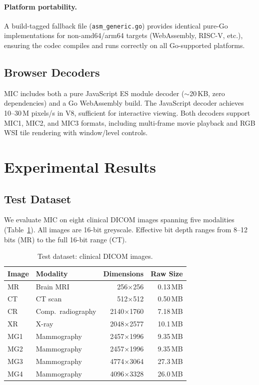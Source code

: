 \documentclass[11pt,twocolumn]{article}
\begin{document}
\paragraph{Platform portability.}
A build-tagged fallback file (\texttt{asm\_generic.go}) provides identical pure-Go implementations for non-amd64/arm64 targets (WebAssembly, RISC-V, etc.), ensuring the codec compiles and runs correctly on all Go-supported platforms.

\subsection{Browser Decoders}

MIC includes both a pure JavaScript ES module decoder ($\sim$20\,KB, zero dependencies) and a Go WebAssembly build.
The JavaScript decoder achieves 10--30\,M pixels/s in V8, sufficient for interactive viewing.
Both decoders support MIC1, MIC2, and MIC3 formats, including multi-frame movie playback and RGB WSI tile rendering with window/level controls.

\section{Experimental Results}
\label{sec:results}

\subsection{Test Dataset}

We evaluate MIC on eight clinical DICOM images spanning five modalities (Table~\ref{tab:dataset}).
All images are 16-bit greyscale.
Effective bit depth ranges from 8--12 bits (MR) to the full 16-bit range (CT).

\begin{table}[t]
\centering
\caption{Test dataset: clinical DICOM images.}
\label{tab:dataset}
\small
\begin{tabular}{@{}llrr@{}}
\toprule
Image & Modality & Dimensions & Raw Size \\
\midrule
MR   & Brain MRI     & 256$\times$256   & 0.13\,MB \\
CT   & CT scan       & 512$\times$512   & 0.50\,MB \\
CR   & Comp.\ radiography & 2140$\times$1760 & 7.18\,MB \\
XR   & X-ray         & 2048$\times$2577 & 10.1\,MB \\
MG1  & Mammography   & 2457$\times$1996 & 9.35\,MB \\
MG2  & Mammography   & 2457$\times$1996 & 9.35\,MB \\
MG3  & Mammography   & 4774$\times$3064 & 27.3\,MB \\
MG4  & Mammography   & 4096$\times$3328 & 26.0\,MB \\
\bottomrule
\end{tabular}
\end{table}
\end{document}

